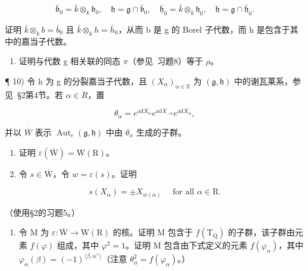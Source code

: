 \[
\bar {\mathfrak {b}} _ {0} = \bar {k} \otimes_ {k} \mathfrak {b} _ {0}, \quad \mathfrak {h} = \mathfrak {g} \cap \bar {\mathfrak {b}} _ {0}, \quad \bar {\mathfrak {h}} _ {0} = \bar {k} \otimes_ {k} \mathfrak {h} _ {0}, \quad \mathfrak {h} = \mathfrak {g} \cap \bar {\mathfrak {h}} _ {0}.
\]

证明 \(\bar{k}\otimes_{k}b=\bar{b}_{0}\) 且 \(\bar{k}\otimes_{k}h=\bar{h}_{0}\)，从而 b 是 g 的 Borel 子代数，而 h 是包含于其中的嘉当子代数。

\begin{enumerate}
\def\labelenumi{\alph{enumi})}
\setcounter{enumi}{2}
\tightlist
\item
  证明与代数 g 相关联的同态 \(\pi\)（参见~习题8）等于 \(\rho\)。
\end{enumerate}

¶ 10) 令 h 为 g 的分裂嘉当子代数，且 \((X_{\alpha})_{\alpha\in\mathbb{R}}\) 为 \((\mathfrak{g},\mathfrak{h})\) 中的谢瓦莱系，参见~§2第4节。若 \(\alpha\in R\)，置

\[
\theta_ {\alpha} = e ^ {\mathrm{ad} X _ {\alpha}} e ^ {\mathrm{ad} X _ {- \alpha}} e ^ {\mathrm{ad} X _ {\alpha}},
\]

并以 \(\overline{W}\) 表示 \(\operatorname{Aut}_{e}(\mathfrak{g},\mathfrak{h})\) 中由 \(\theta_{\alpha}\) 生成的子群。

\begin{enumerate}
\def\labelenumi{\alph{enumi})}
\item
  证明 \(\varepsilon (\overline{\mathrm{W}}) = \mathrm{W}(\mathrm{R})\)。
\item
  令 \(s \in \overline{\mathrm{W}}\)，令 \(w = \varepsilon(s)\)。证明
\end{enumerate}

\[
s (X _ {\alpha}) = \pm X _ {w (\alpha)} \quad \text {   for   all   } \alpha \in \mathrm{R}.
\]

（使用§2的习题5。）

\begin{enumerate}
\def\labelenumi{\alph{enumi})}
\setcounter{enumi}{2}
\tightlist
\item
  令 M 为 \(\varepsilon : \overline{\mathrm{W}} \to \mathrm{W}(\mathrm{R})\) 的核。证明 M 包含于 \(f(\mathrm{T}_{\mathrm{Q}})\) 的子群，该子群由元素 \(f(\varphi)\) 组成，其中 \(\varphi^2 = 1\)。证明 M 包含由下式定义的元素 \(f(\varphi_{\alpha})\)，其中 \(\varphi_{\alpha}(\beta) = (-1)^{\langle \beta, \alpha^{\vee} \rangle}\)（注意 \(\theta_{\alpha}^{2} = f(\varphi_{\alpha})\)。）
\end{enumerate}

